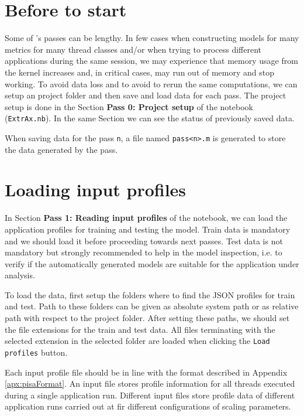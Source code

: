 \documentclass[a4paper, 10pt]{article}
\begin{document}
\section{Before to start}
\label{sec:beginning}
Some of \ex's passes can be lengthy. In few cases when constructing models for many metrics for many
thread classes and/or when trying to process different applications during the same \mathe session,
we may experience that memory usage from the \mathe kernel increases and, in critical cases, \mathe
may run out of memory and stop working. To avoid data loss and to avoid to rerun the same computations,
we can setup an \ex project folder and then save and load data for each pass.
The project setup is done in the Section \textbf{Pass 0: Project setup} of the \ex notebook (\verb!ExtrAx.nb!).
In the same Section we can see the status of previously saved data.

When saving data for the \ex pass \verb!n!, a file named \verb!pass<n>.m! is generated to store the \mathe data
generated by the \ex pass.

\section{Loading input profiles}
\label{sec:input}

In Section \textbf{Pass 1: Reading input profiles} of the \ex notebook, we can load the application profiles for training and testing
the model. Train data is mandatory and we should load it before proceeding towards next \ex passes.
Test data is not mandatory but strongly recommended to help in the model inspection, i.e. to verify if the automatically generated models
are suitable for the application under analysis.

To load the data, first setup the folders where to find the JSON profiles for train and test. Path to these folders can be given
as absolute system path or as relative path with respect to the \ex project folder. After setting these paths, we should set the file extensions
for the train and test data. All files terminating with the selected extension in the selected folder are loaded when clicking the
\verb!Load profiles! button.

Each input profile file should be in line with the format described in Appendix \ref{apx:pisaFormat}. An
input file stores profile information for all threads executed during a single application run. Different input files store profile
data of different application runs carried out at fir different configurations of scaling parameters.
\end{document}
